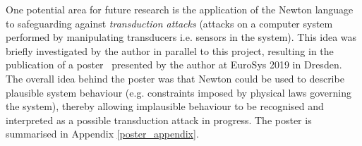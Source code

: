 \documentclass[12pt]{article}
\begin{document}
    One potential area for future research is the application of the Newton language to safeguarding against \textit{transduction attacks} (attacks on a computer system performed by manipulating transducers i.e. sensors in the system). This idea was briefly investigated by the author in parallel to this project, resulting in the publication of a poster~\cite{eurosys_poster} presented by the author at EuroSys 2019 in Dresden. The overall idea behind the poster was that Newton could be used to describe plausible system behaviour (e.g. constraints imposed by physical laws governing the system), thereby allowing implausible behaviour to be recognised and interpreted as a possible transduction attack in progress. The poster is summarised in Appendix \ref{poster_appendix}.


\newpage



\noindent

\markboth{}{}
\printbibliography
\markboth{}{}

\newpage
\end{document}
